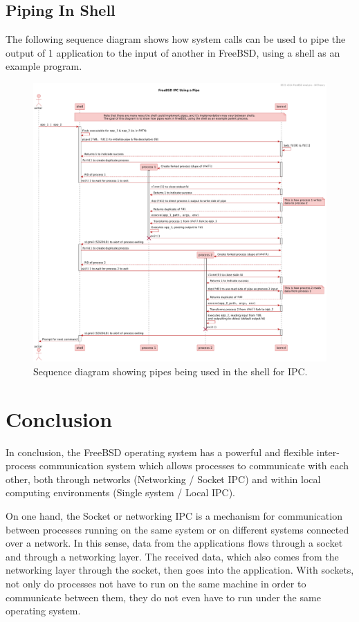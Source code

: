 \documentclass[12pt, dvipsnames, a4paper]{article}
\begin{document}
\subsection{Piping In Shell}
The following sequence diagram shows how system calls can be used to pipe the
output of 1 application to the input of another in FreeBSD, using a shell
as an example program.
\begin{figure}[!htb]
	\advance\leftskip-0.5cm
	\includegraphics[width = 570pt]{assets/use_case_diagrams/pipe.pdf}
	\caption{Sequence diagram showing pipes being used in the shell for IPC. \cite{pipe}\cite{fork}\cite{wait}\cite{close}\cite{dup}\cite{execve}\cite{signal}\cite{pipe-explained}}
\end{figure}

\clearpage
\section{Conclusion}
In conclusion, the FreeBSD operating system has a powerful and flexible inter-process communication system which allows processes to communicate with each other, both through networks (Networking / Socket IPC) and within local computing environments (Single system / Local IPC).

On one hand, the Socket or networking IPC is a mechanism for communication between processes running on the same system or on different systems connected over a network. In this sense, data from the applications flows through a socket and through a networking layer. The received data, which also comes from the networking layer through the socket, then goes into the application. With sockets, not only do processes not have to run on the same machine in order to communicate between them, they do not even have to run under the same operating system.
\end{document}
